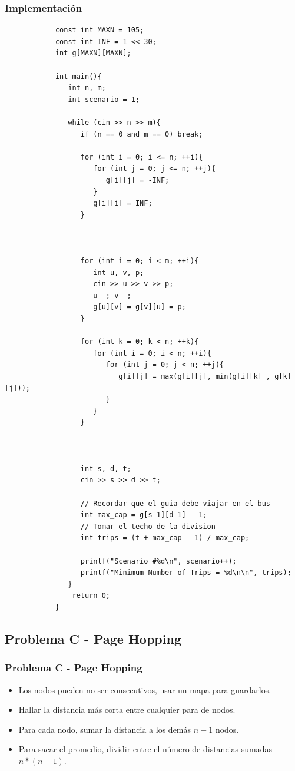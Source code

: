 \documentclass{beamer}
\begin{document}
	\begin{frame}
		\frametitle{Implementación}
		\begin{lstlisting}
			const int MAXN = 105;
			const int INF = 1 << 30;
			int g[MAXN][MAXN];

			int main(){
			   int n, m;
			   int scenario = 1;
			
			   while (cin >> n >> m){
			      if (n == 0 and m == 0) break;
			
			      for (int i = 0; i <= n; ++i){
			         for (int j = 0; j <= n; ++j){
			            g[i][j] = -INF;
			         }
			         g[i][i] = INF;
			      }



			      for (int i = 0; i < m; ++i){
			         int u, v, p;
			         cin >> u >> v >> p;
			         u--; v--;
			         g[u][v] = g[v][u] = p;
			      }

			      for (int k = 0; k < n; ++k){
			         for (int i = 0; i < n; ++i){
			            for (int j = 0; j < n; ++j){
			               g[i][j] = max(g[i][j], min(g[i][k] , g[k][j]));
			            }
			         }
			      }



			      int s, d, t;
			      cin >> s >> d >> t;
			
			      // Recordar que el guia debe viajar en el bus
			      int max_cap = g[s-1][d-1] - 1;
			      // Tomar el techo de la division
			      int trips = (t + max_cap - 1) / max_cap;

			      printf("Scenario #%d\n", scenario++);
			      printf("Minimum Number of Trips = %d\n\n", trips);
			   }
			    return 0;
			}
		\end{lstlisting}
	\end{frame}
	
	\subsection{Problema C - Page Hopping}
	\begin{frame}
		\frametitle{Problema C - Page Hopping}
		\begin{itemize}
			\item Los nodos pueden no ser consecutivos, usar un mapa para guardarlos.
			\item Hallar la distancia más corta entre cualquier para de nodos.
			\item Para cada nodo, sumar la distancia a los demás $n-1$ nodos.
			\item Para sacar el promedio, dividir entre el número de distancias sumadas $n * (n-1)$.
		\end{itemize}
		
	\end{frame}
	
\end{document}
